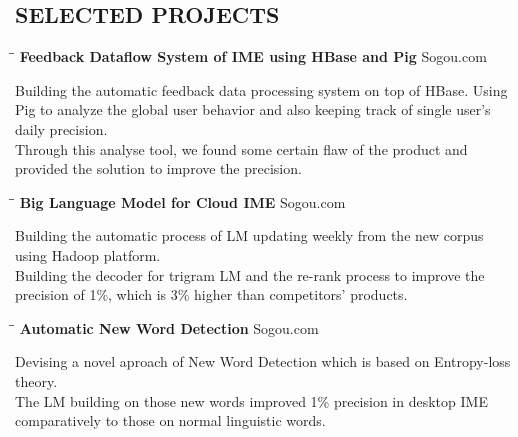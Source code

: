 \documentclass{res}
\begin{document}
\begin{resume}
\section{SELECTED PROJECTS}
   \vspace{-0.1in}	
   \begin{tabbing}
   \hspace{2.3in}\= \hspace{2.6in}\= \kill %
    {\bf Feedback Dataflow System of IME using HBase and Pig}\> \>Sogou.com     \\
   \end{tabbing}\vspace{-20pt}      %
   Building the automatic feedback data processing system on top of HBase. Using Pig to analyze the global user behavior and also keeping track of single user's daily precision. \\
   Through this analyse tool, we found some certain flaw of the product and provided the solution to improve the precision.
   \begin{tabbing}
   \hspace{2.3in}\= \hspace{2.6in}\= \kill %
    {\bf Big Language Model for Cloud IME} \> \>Sogou.com     \\
   \end{tabbing}\vspace{-20pt}      %
   Building the automatic process of LM updating weekly from the new corpus using Hadoop platform. \\
   Building the decoder for trigram LM and the re-rank process to improve the precision of 1\%, which is 3\% higher than competitors' products.
   \begin{tabbing}
   \hspace{2.3in}\= \hspace{2.6in}\= \kill %
    {\bf Automatic New Word Detection}\> \>Sogou.com     \\
   \end{tabbing}\vspace{-20pt}      %
   Devising a novel aproach of New Word Detection which is based on Entropy-loss theory.\\
   The LM building on those new words improved 1\% precision in desktop IME comparatively to those on normal linguistic words.
   \begin{tabbing}

\end{tabbing}
\end{resume}
\end{document}
